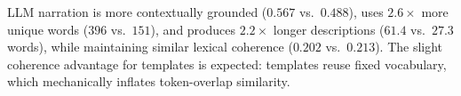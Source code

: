 LLM narration is more contextually grounded ($0.567$ vs.\ $0.488$), uses $2.6\times$ more unique words ($396$ vs.\ $151$), and produces $2.2\times$ longer descriptions ($61.4$ vs.\ $27.3$ words), while maintaining similar lexical coherence ($0.202$ vs.\ $0.213$). The slight coherence advantage for templates is expected: templates reuse fixed vocabulary, which mechanically inflates token-overlap similarity.
